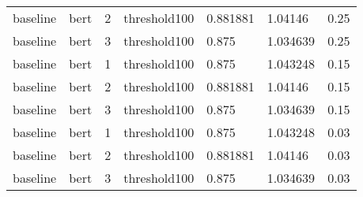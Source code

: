 \begin{tabular}{lllllll}
             baseline &  bert &   2 & threshold100 &  0.881881 &   1.04146 &   0.25 \\
             baseline &  bert &   3 & threshold100 &     0.875 &  1.034639 &   0.25 \\
             baseline &  bert &   1 & threshold100 &     0.875 &  1.043248 &   0.15 \\
             baseline &  bert &   2 & threshold100 &  0.881881 &   1.04146 &   0.15 \\
             baseline &  bert &   3 & threshold100 &     0.875 &  1.034639 &   0.15 \\
             baseline &  bert &   1 & threshold100 &     0.875 &  1.043248 &   0.03 \\
             baseline &  bert &   2 & threshold100 &  0.881881 &   1.04146 &   0.03 \\
             baseline &  bert &   3 & threshold100 &     0.875 &  1.034639 &   0.03 \\
\bottomrule
\end{tabular}
